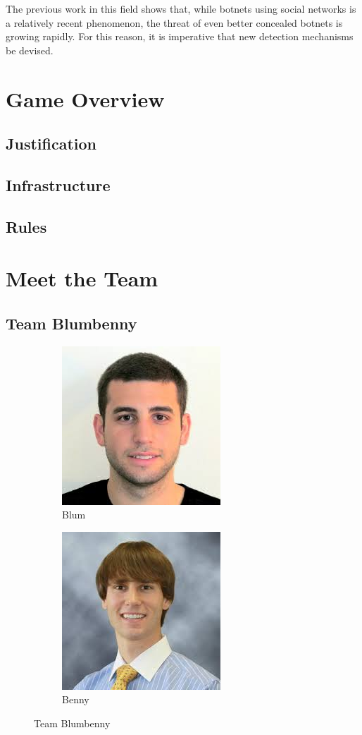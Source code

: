 \documentclass[11pt, oneside]{article} %
\numberwithin{equation}{section} %
\numberwithin{figure}{section} %
\numberwithin{table}{section} %
\begin{document}
The previous work in this field shows that, while botnets using social networks is a relatively recent phenomenon, the threat of even better concealed botnets is growing rapidly.  For this reason, it is imperative that new detection mechanisms be devised.

\section{Game Overview}
	\subsection{Justification}
	\subsection{Infrastructure}
	\subsection{Rules}

\section{Meet the Team}
	\subsection{Team Blumbenny}

	\begin{figure}
		\centering
		\begin{subfigure}{.4\textwidth}
			\centering
			\includegraphics[width=.4\textwidth]{resources/blum.jpg}
			\caption{Blum}
		\end{subfigure}
		\begin{subfigure}{.4\textwidth}
			\centering
			\includegraphics[width=.4\textwidth]{resources/benny.jpg}
			\caption{Benny}
		\end{subfigure}
		\caption{Team Blumbenny}
	\end{figure}
\end{document}
